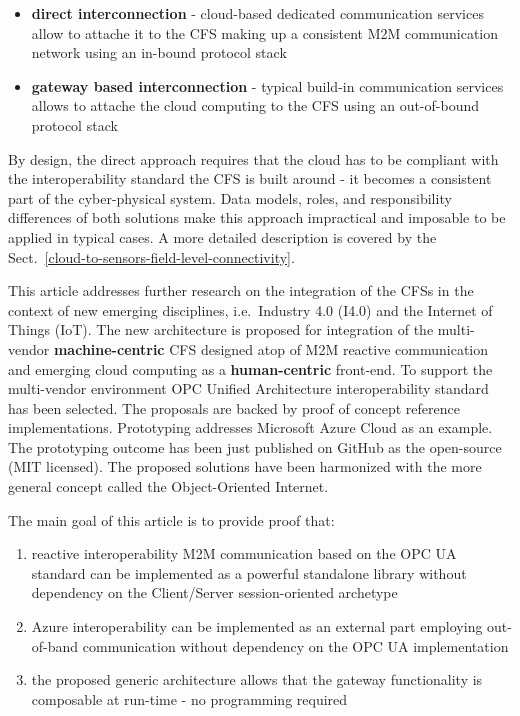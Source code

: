 \documentclass{jacsart}
\providecommand{\tightlist} { \setlength{\itemsep}{0pt}\setlength{\parskip}{0pt}}
\begin{document}
\begin{itemize}
      \tightlist
      \item
            \textbf{direct interconnection} - cloud-based dedicated communication
            services allow to attache it to the CFS making up a
            consistent M2M communication network using an in-bound protocol stack
      \item
            \textbf{gateway based interconnection} - typical build-in
            communication services allows to attache the cloud computing to the
            CFS using an out-of-bound protocol stack
\end{itemize}

By design, the direct approach requires that the cloud has to be
compliant with the interoperability standard the CFS
is built around - it becomes a consistent part of the cyber-physical
system. Data models, roles, and responsibility differences of both
solutions make this approach impractical and imposable to be applied in
typical cases. A more detailed description is covered by the Sect.~\ref*{cloud-to-sensors-field-level-connectivity}.

This article addresses further research on the integration of the
CFSs in the context of new emerging disciplines,
i.e.~Industry 4.0 (I4.0) and the Internet of Things (IoT). The new
architecture is proposed for integration of the multi-vendor
\textbf{machine-centric} CFS designed atop of M2M
reactive communication and emerging cloud computing as a
\textbf{human-centric} front-end. To support the multi-vendor
environment OPC Unified Architecture interoperability standard has been
selected. The proposals are backed by proof of concept reference
implementations. Prototyping addresses Microsoft Azure Cloud as an
example. The prototyping outcome has been just published on GitHub as
the open-source (MIT licensed). The proposed solutions have been
harmonized with the more general concept called the Object-Oriented
Internet.

The main goal of this article is to provide proof that:

\begin{enumerate}
      \def\labelenumi{\arabic{enumi}.}
      \tightlist
      \item
            reactive interoperability M2M communication based on the OPC UA
            standard can be implemented as a powerful standalone library without
            dependency on the Client/Server session-oriented archetype
      \item
            Azure interoperability can be implemented as an external part
            employing out-of-band communication without dependency on the OPC UA
            implementation
      \item
            the proposed generic architecture allows that the gateway
            functionality is composable at run-time - no programming required
\end{enumerate}
\end{document}
